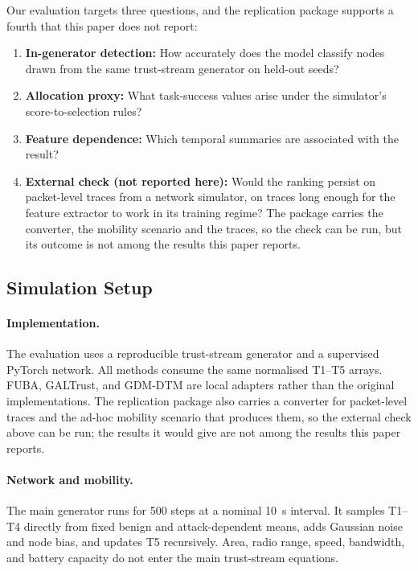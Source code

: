 \documentclass[notspecified,article,submit,moreauthors]{Definitions/mdpi}
\begin{document}
Our evaluation targets three questions, and the replication package supports a fourth that this paper does not report:
\begin{enumerate}[label={(\textbf{Q\arabic*})},leftmargin=*]
    \item \textbf{In-generator detection:} How accurately does the model classify nodes drawn from the same trust-stream generator on held-out seeds?
    \item \textbf{Allocation proxy:} What task-success values arise under the simulator's score-to-selection rules?
    \item \textbf{Feature dependence:} Which temporal summaries are associated with the result?
    \item \textbf{External check (not reported here):} Would the ranking persist on packet-level traces from a network simulator, on traces long enough for the feature extractor to work in its training regime? The package carries the converter, the mobility scenario and the traces, so the check can be run, but its outcome is not among the results this paper reports.
\end{enumerate}

\subsection{Simulation Setup}
\label{sec:sim_setup}

\paragraph{Implementation.}
The evaluation uses a reproducible trust-stream generator and a supervised PyTorch network. All methods consume the same normalised T1--T5 arrays. FUBA, GALTrust, and GDM-DTM are local adapters rather than the original implementations. The replication package also carries a converter for packet-level traces and the ad-hoc mobility scenario that produces them, so the external check above can be run; the results it would give are not among the results this paper reports.

\paragraph{Network and mobility.}
The main generator runs for 500 steps at a nominal 10~s interval. It samples T1--T4 directly from fixed benign and attack-dependent means, adds Gaussian noise and node bias, and updates T5 recursively. Area, radio range, speed, bandwidth, and battery capacity do not enter the main trust-stream equations.
\end{document}
